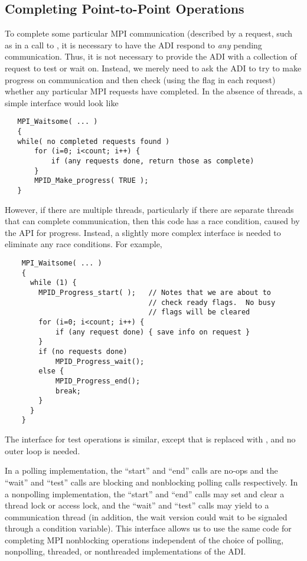 
\subsection{Completing Point-to-Point Operations}

To complete some particular MPI communication (described by a request,
such as in a call to , it is necessary to have the ADI
respond to \emph{any} pending communication.  Thus, it is not
necessary to provide the ADI with a collection of request to test or
wait on.  Instead, we merely need to ask the ADI to try to make
progress on communication and then check (using the  flag
in each request) whether any particular MPI requests have completed.
In the absence of threads, a simple interface would look like
\begin{verbatim}
   MPI_Waitsome( ... )
   {
   while( no completed requests found ) 
       for (i=0; i<count; i++) {
           if (any requests done, return those as complete)
       }
       MPID_Make_progress( TRUE );
   }
\end{verbatim}
However, if there are multiple threads, particularly if there are
separate threads that can complete communication,
then this code has a race condition, caused by the API for progress.
Instead, a slightly more complex interface is needed to
eliminate any race conditions.  For example,
\begin{verbatim}
    MPI_Waitsome( ... )
    {
      while (1) {
        MPID_Progress_start( );   // Notes that we are about to
                                  // check ready flags.  No busy 
                                  // flags will be cleared
        for (i=0; i<count; i++) {
            if (any request done) { save info on request }
        }
        if (no requests done) 
            MPID_Progress_wait();
        else {
            MPID_Progress_end();
            break;
        }
      }
    }
\end{verbatim}
The interface for test operations is similar, except that
 is replaced with ,
and no outer loop is needed.

In a polling implementation, the ``start'' and ``end'' calls are
no-ops and the ``wait'' and ``test'' calls are blocking and
nonblocking polling calls respectively.  In a nonpolling
implementation, the ``start'' and ``end'' calls may set and clear a thread lock
or access lock, and the ``wait'' and ``test'' calls may yield to a
communication thread (in addition, the wait version could wait to be
signaled through a condition variable).  This interface allows us to
use the same code for completing MPI nonblocking operations
independent of the choice of polling, nonpolling, threaded, or
nonthreaded implementations of the ADI.

